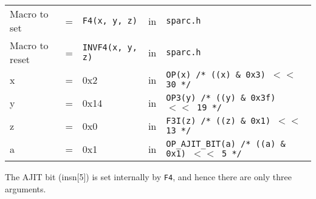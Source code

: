 \begin{enumerate}
  \begin{tabular}[h]{lclcl}
    Macro to set  &=& \texttt{F4(x, y, z)} &in& \texttt{sparc.h}     \\
    Macro to reset  &=& \texttt{INVF4(x, y, z)} &in& \texttt{sparc.h}     \\
    x &=& 0x2      &in& \texttt{OP(x)  /* ((x) \& 0x3)  $<<$ 30 */} \\
    y &=& 0x14     &in& \texttt{OP3(y) /* ((y) \& 0x3f) $<<$ 19 */} \\
    z &=& 0x0      &in& \texttt{F3I(z) /* ((z) \& 0x1)  $<<$ 13 */} \\
    a &=& 0x1      &in& \texttt{OP\_AJIT\_BIT(a) /* ((a) \& 0x1)  $<<$ 5 */}
  \end{tabular}

  The AJIT bit  (insn[5]) is set internally by  \texttt{F4}, and hence
  there are only three arguments.
\end{enumerate}
